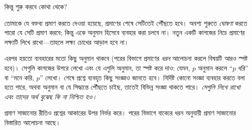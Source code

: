 \documentclass[../../../include/open-logic-section]{subfiles}
\begin{document}


কিন্তু শুরু করবে কোথা থেকে?

তোমাকে যে বক্তব্য প্রমাণ করতে দেওয়া হয়েছে, প্রমাণের
শেষে সেটিতেই পৌঁছতে হবে। অবশ্য শুরুতে \emph{ঘোষণা}
করতে পারো যে সেটি প্রমাণ করবে; কিন্তু একে অনুমান হিসেবে
ব্যবহার করা চলবে না। নতুন একটি কাগজের নিচে প্রমাণের
লক্ষ্যটি লিখে রাখো—তাহলে লক্ষ্য চোখের আড়াল হবে না।

এরপর হয়তো ব্যবহারের মতো কিছু অনুমান থাকবে (পরের বিভাগে
প্রমাণের \emph{ধরন} আলোচনা করলে বিষয়টি আরও স্পষ্ট হবে)।
সেগুলি কাগজের উপরে লেখো এবং যে এগুলি অনুমান, তা স্পষ্ট
করে দাও: যেমন, $p$ অনুমান করলে ``$p$ ধরি'' বা
``মনে করি, $p$'' লেখো। শেষে প্রশ্নে ব্যবহৃত কিছু সংজ্ঞাও
জানতে হবে। নির্দিষ্ট কোনো সংজ্ঞা ব্যবহার করতে বলা হতে
পারে, অথবা অনুমান বা যে সিদ্ধান্তে পৌঁছতে চাইছ, তাতেই
বিভিন্ন সংজ্ঞা থাকতে পারে। \emph{সেগুলি লিখে রাখো এবং
তাদের অর্থ বুঝেছ কি না নিশ্চিত হও।}

প্রমাণ সাজানোর রীতিও প্রশ্নের আকারের উপর নির্ভর করে।
পরের বিভাগে বাক্যের ধরন অনুযায়ী প্রমাণ সাজানোর বিস্তারিত
আলোচনা আছে।
\end{document}
